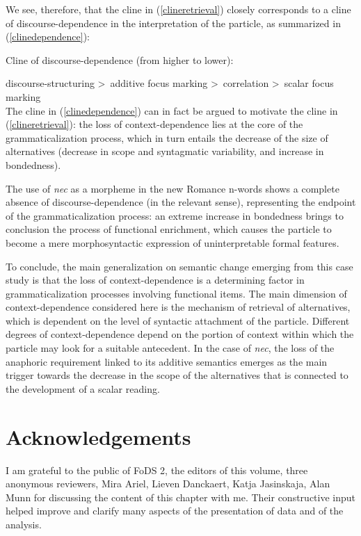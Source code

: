 \documentclass[output=paper,modfonts,nonflat,citecolor=brown,
showindex
]{langsci/langscibook}
\begin{document}
We see, therefore, that the cline in (\ref{clineretrieval}) closely corresponds to a cline of discourse-dependence in the interpretation of the particle, as summarized in (\ref{clinedependence}):

{\begin{exe}
\ex \label{clinedependence} Cline of discourse-dependence (from higher to lower):
\end{exe}}
\noindent discourse-structuring \textgreater \ additive focus marking \textgreater \ correlation \textgreater \ scalar focus marking\\

\noindent The cline in (\ref{clinedependence}) can in fact be argued to motivate the cline in (\ref{clineretrieval}): the loss of context-dependence lies at the core of the grammaticalization process, which in turn entails the decrease of the size of alternatives (decrease in scope and syntagmatic variability, and increase in bondedness).

The use of {\em{nec}} as a morpheme in the new Romance n-words shows a complete absence of discourse-dependence (in the relevant sense), representing the endpoint of the grammaticalization process: an extreme increase in bondedness brings to conclusion the process of functional enrichment, which causes the particle to become a mere morphosyntactic expression of uninterpretable formal features.

To conclude, the main generalization on semantic change emerging from this case study is that the loss of context-dependence is a determining factor in grammaticalization processes involving functional items. The main dimension of context-dependence considered here is the mechanism of retrieval of alternatives, which is dependent on the level of syntactic attachment of the particle. Different degrees of context-dependence depend on the portion of context within which the particle may look for a suitable antecedent. In the case of {\em{nec}}, the loss of the anaphoric requirement linked to its additive semantics emerges as the main trigger towards the decrease in the scope of the alternatives that is connected to the development of a scalar reading.  


\section*{Acknowledgements}
I am grateful to the public of FoDS 2, the editors of this volume, three anonymous reviewers, Mira Ariel, Lieven Danckaert, Katja Jasinskaja, Alan Munn for discussing the content of this chapter with me. Their constructive input helped improve and clarify many aspects of the presentation of data and of the analysis. 

\printbibliography[heading=subbibliography,notkeyword=this]
\end{document}
